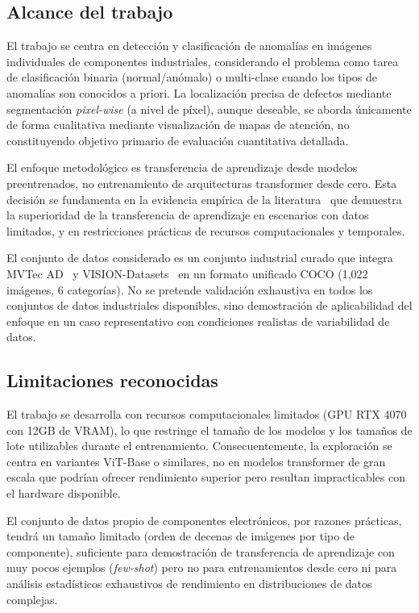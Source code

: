 \subsection{Alcance del trabajo}

El trabajo se centra en detección y clasificación de anomalías en imágenes individuales de componentes industriales, considerando el problema como tarea de clasificación binaria (normal/anómalo) o multi-clase cuando los tipos de anomalías son conocidos a priori. La localización precisa de defectos mediante segmentación \textit{pixel-wise} (a nivel de píxel), aunque deseable, se aborda únicamente de forma cualitativa mediante visualización de mapas de atención, no constituyendo objetivo primario de evaluación cuantitativa detallada.

El enfoque metodológico es transferencia de aprendizaje desde modelos preentrenados, no entrenamiento de arquitecturas transformer desde cero. Esta decisión se fundamenta en la evidencia empírica de la literatura~\cite{huang2025semiconductor,khan2024survey} que demuestra la superioridad de la transferencia de aprendizaje en escenarios con datos limitados, y en restricciones prácticas de recursos computacionales y temporales.

El conjunto de datos considerado es un conjunto industrial curado que integra MVTec AD~\cite{bergmann2019mvtec} y VISION-Datasets~\cite{bai2023visiondatasets} en un formato unificado COCO (1{,}022 imágenes, 6 categorías). No se pretende validación exhaustiva en todos los conjuntos de datos industriales disponibles, sino demostración de aplicabilidad del enfoque en un caso representativo con condiciones realistas de variabilidad de datos.

\subsection{Limitaciones reconocidas}

El trabajo se desarrolla con recursos computacionales limitados (\acrshort{GPU} RTX 4070 con 12GB de \acrshort{VRAM}), lo que restringe el tamaño de los modelos y los tamaños de lote utilizables durante el entrenamiento. Consecuentemente, la exploración se centra en variantes ViT-Base o similares, no en modelos transformer de gran escala que podrían ofrecer rendimiento superior pero resultan impracticables con el hardware disponible.

El conjunto de datos propio de componentes electrónicos, por razones prácticas, tendrá un tamaño limitado (orden de decenas de imágenes por tipo de componente), suficiente para demostración de transferencia de aprendizaje con muy pocos ejemplos (\textit{few-shot}) pero no para entrenamientos desde cero ni para análisis estadísticos exhaustivos de rendimiento en distribuciones de datos complejas.

